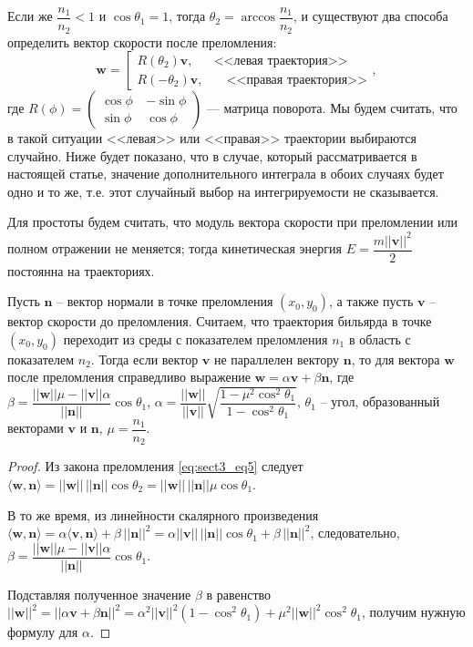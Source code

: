 Если же $\dfrac{n_1}{n_2} < 1 $ и $\cos \theta_1 = 1$, тогда  $\theta_2 = \arccos \dfrac{n_1}{n_2}$, и существуют два способа определить вектор скорости после преломления: 
\begin{equation}
    \mathbf{w}= \left[
\begin{array}{rr}
    R(\theta_2) \mathbf{v}, & \text{<<левая траектория>>} \\
    R(-\theta_2) \mathbf{v},  & \quad \text{<<правая траектория>>}
\end{array}
\right.,
\label{eq:sect3_eq6}
\end{equation}
где $R(\phi) = 
\left(
    \begin{array}{rr}
    \cos \phi \ & -\sin \phi \\
    \sin \phi \ & \cos \phi 
    \end{array}
\right)
    $ --- матрица поворота.
Мы будем считать, что в такой ситуации <<левая>> или <<правая>> траектории выбираются случайно. Ниже будет показано, что в случае, который рассматривается в настоящей статье, значение дополнительного интеграла в обоих случаях будет одно и то же, т.е. этот случайный выбор на интегрируемости не сказывается.


Для простоты будем считать, что модуль вектора скорости при преломлении или полном отражении не меняется; тогда кинетическая энергия $E=\dfrac{m || \mathbf{v} || ^2}{2} $ постоянна на траекториях.

 \begin{statement}
Пусть $\mathbf{n}$ -- вектор нормали в точке преломления $(x_0, y_0)$, а также пусть $\mathbf{v}$ -- вектор скорости до преломления. Считаем, что траектория бильярда в точке $(x_0, y_0)$ переходит из среды с показателем преломления $n_1$ в область с показателем $n_2$. Тогда если вектор $\mathbf{v}$ не параллелен вектору $\mathbf{n}$, то для вектора   $\mathbf{w}$  после преломления справедливо выражение 
$\mathbf{w} = \alpha \mathbf{v} + \beta \mathbf{n}$, где $\beta = \dfrac{||\mathbf{w}|| \mu - ||\mathbf{v}|| \alpha}{||\mathbf{n}||}\cos{\theta_1}$, $\alpha = \dfrac{||\mathbf{w}||}{||\mathbf{v}||}\sqrt{\dfrac{1-\mu^2\cos^2 \theta_1}{1-\cos^2 \theta_1 }}$, $\theta_1$ -- угол, образованный векторами $\mathbf{v}$ и $\mathbf{n}$, $\mu = \dfrac{n_1}{n_2}$.
\end{statement}
\begin{proof}
Из закона преломления \eqref{eq:sect3_eq5} следует 
$\langle\mathbf{w}, \mathbf{n}\rangle = ||\mathbf{w}||\, ||\mathbf{n}|| \cos \theta_2 = ||\mathbf{w}||\, ||\mathbf{n}|| \mu \cos \theta_1$.

В то же время, из линейности скалярного произведения
$\langle\mathbf{w}, \mathbf{n}\rangle = \alpha \langle\mathbf{v}, \mathbf{n}\rangle + \beta\, ||\mathbf{n}||^2 = \alpha ||\mathbf{v}||\, ||\mathbf{n}|| \cos \theta_1 + \beta\, ||\mathbf{n}||^2$, следовательно, $\beta = \dfrac{||\mathbf{w}|| \mu - ||\mathbf{v}|| \alpha}{||\mathbf{n}||}\cos{\theta_1}$. 

Подставляя полученное значение $\beta$ в равенство $||\mathbf{w}||^2 = ||\alpha \mathbf{v} + \beta \mathbf{n}||^2 = \alpha^2 ||\mathbf{v}||^2 (1-\cos^2 \theta_1) + \mu^2||\mathbf{w}||^2 \cos^2 \theta_1$, получим нужную формулу для  $\alpha$.
\end{proof}

